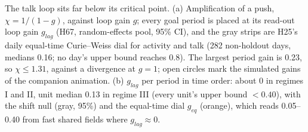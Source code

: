 \caption{The talk loop sits far below its critical point. (a) Amplification of a push, $\chi=1/(1-g)$, against loop gain $g$; every goal period is placed at its read-out loop gain $g_{lag}$ (H67, random-effects pool, 95\% CI), and the gray strips are H25's daily equal-time Curie--Weiss dial for activity and talk (282 non-holdout days, medians 0.16; no day's upper bound reaches 0.8). The largest period gain is 0.23, so $\chi\le1.31$, against a divergence at $g=1$; open circles mark the simulated gains of the companion animation. (b) $g_{lag}$ per period in time order: about 0 in regimes I and II, unit median 0.13 in regime III (every unit's upper bound $<0.40$), with the shift null (gray, 95\%) and the equal-time dial $g_{eq}$ (orange), which reads 0.05--0.40 from fast shared fields where $g_{lag}\approx0$.}
\label{fig:H67}
